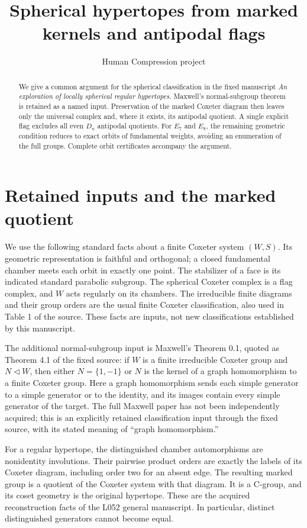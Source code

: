 \documentclass[11pt,a4paper]{article}
\title{Spherical hypertopes from marked kernels and antipodal flags}
\author{Human Compression project}
\date{}
\begin{document}
\maketitle
\begin{abstract}
We give a common argument for the spherical classification in the fixed
manuscript \emph{An exploration of locally spherical regular hypertopes}.
Maxwell's normal-subgroup theorem is retained as a named input. Preservation
of the marked Coxeter diagram then leaves only the universal complex and,
where it exists, its antipodal quotient. A single explicit flag excludes all
even $D_n$ antipodal quotients. For $E_7$ and $E_8$, the remaining geometric
condition reduces to exact orbits of fundamental weights, avoiding an
enumeration of the full groups. Complete orbit certificates accompany the
argument.
\end{abstract}

\section{Retained inputs and the marked quotient}

We use the following standard facts about a finite Coxeter system $(W,S)$.
Its geometric representation is faithful and orthogonal; a closed fundamental
chamber meets each orbit in exactly one point. The stabilizer of a face is
its indicated standard parabolic subgroup. The spherical Coxeter complex is
a flag complex, and $W$ acts regularly on its chambers. The irreducible
finite diagrams and their group orders are the usual finite Coxeter
classification, also used in Table 1 of the source. These facts are inputs,
not new classifications established by this manuscript.

The additional normal-subgroup input is Maxwell's Theorem 0.1, quoted as
Theorem 4.1 of the fixed source: if $W$ is a finite irreducible Coxeter group
and $N\triangleleft W$, then either $N=\{1,-1\}$ or $N$ is the kernel of a
graph homomorphism to a finite Coxeter group. Here a graph homomorphism sends
each simple generator to a simple generator or to the identity, and its
images contain every simple generator of the target. The full Maxwell
paper has not been independently acquired; this is an explicitly retained
classification input through the fixed source, with its stated meaning of
``graph homomorphism.''

For a regular hypertope, the distinguished chamber automorphisms are
nonidentity involutions. Their pairwise product orders are exactly the
labels of its Coxeter diagram, including order two for an absent edge.
The resulting marked group is a quotient of the Coxeter system with that
diagram. It is a C-group, and its coset geometry is the original hypertope.
These are the acquired reconstruction facts of the L052 general manuscript.
In particular, distinct distinguished generators cannot become equal.
\end{document}
